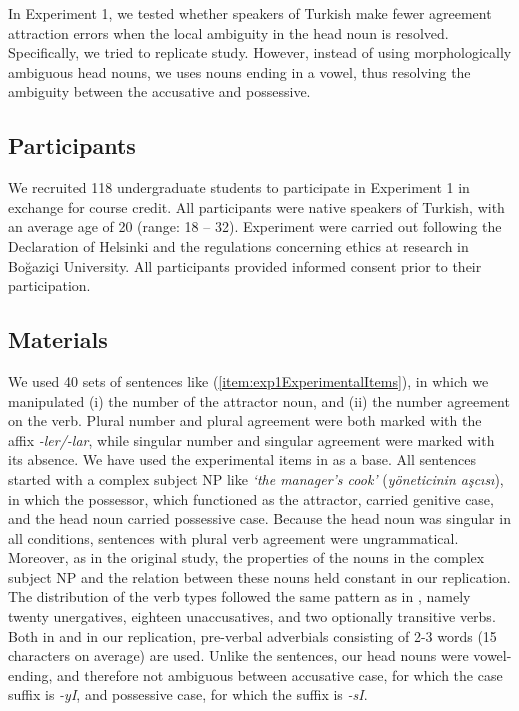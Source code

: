 \documentclass[doc,a4paper,man,natbib,floatsintext,noextraspace]{apa6}
\begin{document}
In Experiment 1, we tested whether speakers of Turkish make fewer agreement attraction errors when the local ambiguity in the head noun is resolved. 
Specifically, we tried to replicate \citet{LagoEtAl:2018} study. However, instead of using morphologically ambiguous head nouns, we uses nouns ending in a vowel, thus resolving the ambiguity between the accusative and possessive. 

\subsection{Participants} \label{sec:exp1:participants}

We recruited 118 undergraduate students to participate in Experiment 1 in exchange for course credit. All participants were native speakers of Turkish, with an average age of 20 (range: 18 -- 32).  
Experiment were carried out following the Declaration of Helsinki and the regulations concerning ethics at research in Bo\u{g}azi\c{c}i University. All participants provided informed consent prior to their participation.

\subsection{Materials} \label{sec:exp1:materials}

We used 40 sets of sentences like (\ref{item:exp1ExperimentalItems}), in which we manipulated 
(i) the number of the attractor noun, and
(ii) the number agreement on the verb. 
Plural number and plural agreement were both marked with the affix \textit{-ler/-lar}, while singular number and singular agreement were marked with its absence. 
%
We have used the experimental items in \citet{LagoEtAl:2018} as a base. 
All sentences started with a complex subject NP like \textit{`the manager's cook'} (\textit{yöneticinin aşcısı}), in which the possessor, which functioned as the attractor, carried genitive case, and the head noun carried possessive case. 
Because the head noun was singular in all conditions, sentences with plural verb agreement were ungrammatical. 
Moreover, as in the original study, the properties of the nouns in the complex subject NP and the relation between these nouns held constant in our replication. 
The distribution of the verb types followed the same pattern as in \citet{LagoEtAl:2018}, namely twenty unergatives, eighteen unaccusatives, and two optionally transitive verbs. 
Both in \citet{LagoEtAl:2018} and in our replication, pre-verbal adverbials consisting of 2-3 words (15 characters on average) are used.
Unlike the \citet{LagoEtAl:2018} sentences, our head nouns were vowel-ending, and therefore not ambiguous between accusative case, for which the case suffix is \textit{-yI}, and possessive case, for which the suffix is \textit{-sI}. 
\end{document}
